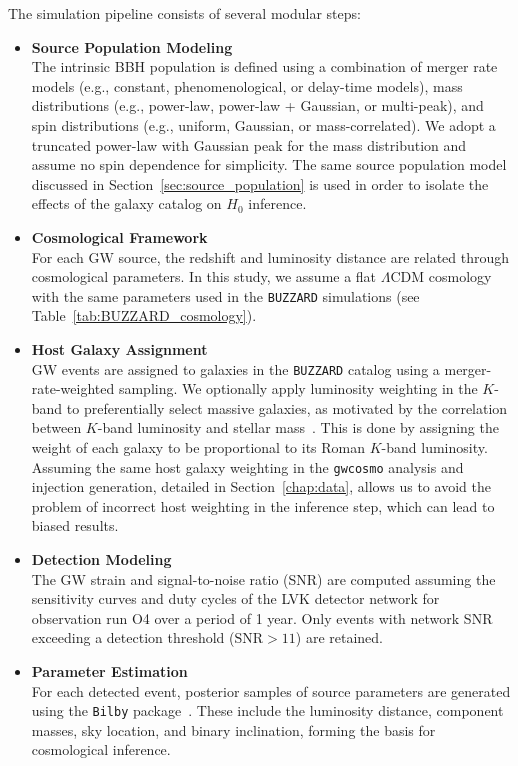 The simulation pipeline consists of several modular steps:
\begin{itemize}
    \item \textbf{Source Population Modeling}\\
    The intrinsic \ac{BBH} population is defined using a combination of merger rate models (e.g., constant, phenomenological, or delay-time models), mass distributions (e.g., power-law, power-law + Gaussian, or multi-peak), and spin distributions (e.g., uniform, Gaussian, or mass-correlated). We adopt a truncated power-law with Gaussian peak for the mass distribution and assume no spin dependence for simplicity. The same source population model discussed in Section~\ref{sec:source_population} is used in order to isolate the effects of the galaxy catalog on $H_0$ inference.

    \item \textbf{Cosmological Framework}\\
    For each \ac{GW} source, the redshift and luminosity distance are related through cosmological parameters. In this study, we assume a flat $\Lambda$CDM cosmology with the same parameters used in the \texttt{BUZZARD} simulations (see Table~\ref{tab:BUZZARD_cosmology}).

    \item \textbf{Host Galaxy Assignment}\\
    \ac{GW} events are assigned to galaxies in the \texttt{BUZZARD} catalog using a merger-rate-weighted sampling. We optionally apply luminosity weighting in the $K$-band to preferentially select massive galaxies, as motivated by the correlation between $K$-band luminosity and stellar mass~\citep{strazzullo2006near,sureshkumar2021galaxy}. This is done by assigning the weight of each galaxy to be proportional to its Roman $K$-band luminosity. Assuming the same host galaxy weighting in the \texttt{gwcosmo} analysis and injection generation, detailed in Section~\ref{chap:data}, allows us to avoid the problem of incorrect host weighting in the inference step, which can lead to biased results.

    \item \textbf{Detection Modeling}\\
    The \ac{GW} strain and signal-to-noise ratio (SNR) are computed assuming the sensitivity curves and duty cycles of the \acf{LVK} detector network for observation run O4 over a period of 1 year. Only events with network SNR exceeding a detection threshold ($\mathrm{SNR} > 11$) are retained.

    \item \textbf{Parameter Estimation}\\
    For each detected event, posterior samples of source parameters are generated using the \texttt{Bilby} package~\citep{bilby_paper,bilby_mcmc_paper}. These include the luminosity distance, component masses, sky location, and binary inclination, forming the basis for cosmological inference.
\end{itemize}

